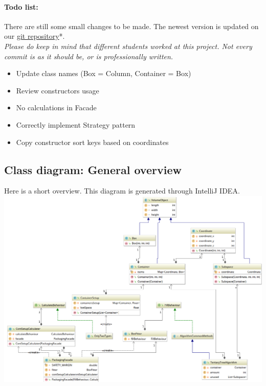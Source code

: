 \documentclass[a4paper,12pt]{article}
\begin{document}
\paragraph{Todo list:} 
There are still some small changes to be made. The newest version is updated on our \hyperref{https://github.com/WannesFransen1994/3D_Bin_Packaging}{}{}{git repository}*.\\
\small \textit{Please do keep in mind that different students worked at this project. Not every commit is as it should be, or is professionally written.}
\begin{itemize}
	\item[] \checkmark Update class names (Box = Column, Container = Box)
	\item[] \checkmark Review constructors usage
	\item[] \checkmark No calculations in Facade
	\item[] \checkmark Correctly implement Strategy pattern
	\item[] \xmark \space Copy constructor sort keys based on coordinates
\end{itemize}
\pagebreak

\subsection{Class diagram: General overview}
Here is a short overview. This diagram is generated through IntelliJ IDEA.\\

\includegraphics[width=17cm]{Class_diagram_overview.png}\\
\end{document}
